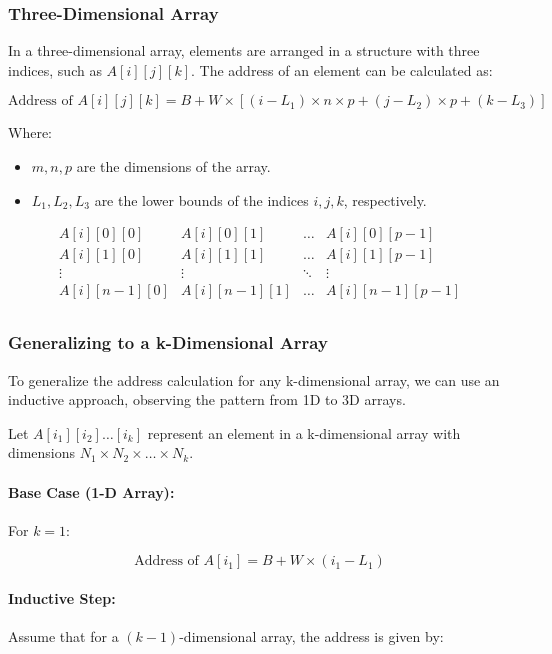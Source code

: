 \documentclass{book}
\begin{document}
\subsubsection{Three-Dimensional Array}

In a three-dimensional array, elements are arranged in a structure with three indices, such as \( A[i][j][k] \). The address of an element can be calculated as:

\[
\text{Address of } A[i][j][k] = B + W \times \left[ (i - L_1) \times n \times p + (j - L_2) \times p + (k - L_3) \right]
\]

Where:
\begin{itemize}
	\item \( m, n, p \) are the dimensions of the array.
	\item \( L_1, L_2, L_3 \) are the lower bounds of the indices \( i, j, k \), respectively.
\end{itemize}

\[
\begin{array}{c|c|c|c}
	A[i][0][0] & A[i][0][1] & \dots & A[i][0][p-1] \\
	\hline
	A[i][1][0] & A[i][1][1] & \dots & A[i][1][p-1] \\
	\hline
	\vdots & \vdots & \ddots & \vdots \\
	\hline
	A[i][n-1][0] & A[i][n-1][1] & \dots & A[i][n-1][p-1] \\
\end{array}
\]

\subsubsection{Generalizing to a k-Dimensional Array}

To generalize the address calculation for any k-dimensional array, we can use an inductive approach, observing the pattern from 1D to 3D arrays.

Let \( A[i_1][i_2] \dots [i_k] \) represent an element in a k-dimensional array with dimensions \( N_1 \times N_2 \times \dots \times N_k \).

\paragraph{Base Case (1-D Array):}
For \( k = 1 \):

\[
\text{Address of } A[i_1] = B + W \times (i_1 - L_1)
\]

\paragraph{Inductive Step:}
Assume that for a \( (k-1) \)-dimensional array, the address is given by:
\end{document}
